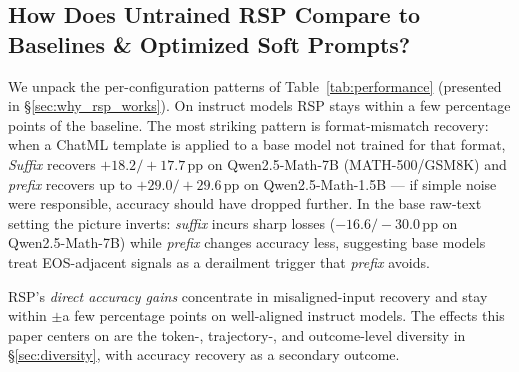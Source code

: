 \subsection{How Does Untrained RSP Compare to Baselines \& Optimized Soft Prompts?}\label{sec:performance}

We unpack the per-configuration patterns of Table~\ref{tab:performance} (presented in \S\ref{sec:why_rsp_works}). On instruct models RSP stays within a few percentage points of the baseline. The most striking pattern is format-mismatch recovery: when a ChatML template is applied to a base model not trained for that format, \emph{Suffix} recovers $+18.2/+17.7$\,pp on Qwen2.5-Math-7B (MATH-500/GSM8K) and \emph{prefix} recovers up to $+29.0/+29.6$\,pp on Qwen2.5-Math-1.5B --- if simple noise were responsible, accuracy should have dropped further. In the base raw-text setting the picture inverts: \emph{suffix} incurs sharp losses ($-16.6/-30.0$\,pp on Qwen2.5-Math-7B) while \emph{prefix} changes accuracy less, suggesting base models treat EOS-adjacent signals as a derailment trigger that \emph{prefix} avoids.

RSP's \emph{direct accuracy gains} concentrate in misaligned-input recovery and stay within $\pm$a few percentage points on well-aligned instruct models. The effects this paper centers on are the token-, trajectory-, and outcome-level diversity in \S\ref{sec:diversity}, with accuracy recovery as a secondary outcome.

